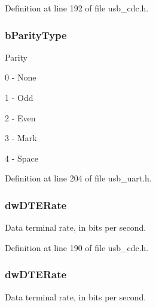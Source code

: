 Definition at line 192 of file usb\-\_\-cdc.\-h.

\hypertarget{struct_u_s_b___c_d_c___line___coding_ad1ba20cae66624339b0301c4cd4fa8b0}{
\subsubsection[{b\-Parity\-Type}]{ b\-Parity\-Type}}\label{struct_u_s_b___c_d_c___line___coding_ad1ba20cae66624339b0301c4cd4fa8b0}
Parity
\begin{DoxyItemize}
\item 0 -\/ None
\item 1 -\/ Odd
\item 2 -\/ Even
\item 3 -\/ Mark
\item 4 -\/ Space
\end{DoxyItemize}

Definition at line 204 of file usb\-\_\-uart.\-h.

\hypertarget{struct_u_s_b___c_d_c___line___coding_a0880b491e21b4049653c96c27616ede0}{
\subsubsection[{dw\-D\-T\-E\-Rate}]{ dw\-D\-T\-E\-Rate}}\label{struct_u_s_b___c_d_c___line___coding_a0880b491e21b4049653c96c27616ede0}
Data terminal rate, in bits per second. 

Definition at line 190 of file usb\-\_\-cdc.\-h.

\hypertarget{struct_u_s_b___c_d_c___line___coding_ac40ee53801054ac7a2b11c4ab27842fa}{
\subsubsection[{dw\-D\-T\-E\-Rate}]{ dw\-D\-T\-E\-Rate}}\label{struct_u_s_b___c_d_c___line___coding_ac40ee53801054ac7a2b11c4ab27842fa}
Data terminal rate, in bits per second. 

